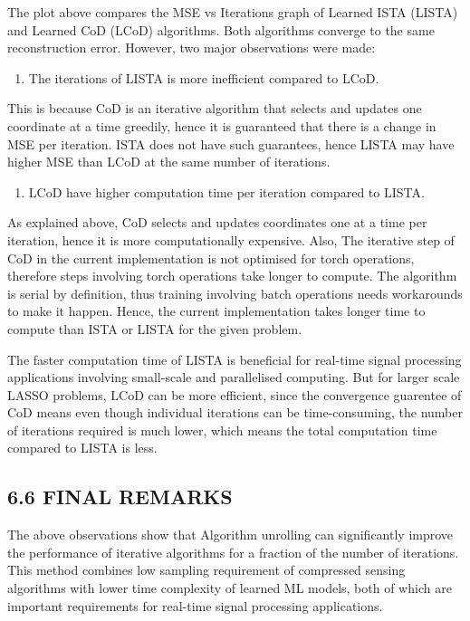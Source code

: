 \documentclass[
  letterpaper,
  DIV=11,
  numbers=noendperiod]{scrartcl}
\providecommand{\tightlist}{%
  \setlength{\itemsep}{0pt}\setlength{\parskip}{0pt}}
\begin{document}
The plot above compares the MSE vs Iterations graph of Learned ISTA
(LISTA) and Learned CoD (LCoD) algorithms. Both algorithms converge to
the same reconstruction error. However, two major observations were
made:

\begin{enumerate}
\def\labelenumi{\arabic{enumi}.}
\tightlist
\item
  The iterations of LISTA is more inefficient compared to LCoD.
\end{enumerate}

This is because CoD is an iterative algorithm that selects and updates
one coordinate at a time greedily, hence it is guaranteed that there is
a change in MSE per iteration. ISTA does not have such guarantees, hence
LISTA may have higher MSE than LCoD at the same number of iterations.

\begin{enumerate}
\def\labelenumi{\arabic{enumi}.}
\setcounter{enumi}{1}
\tightlist
\item
  LCoD have higher computation time per iteration compared to LISTA.
\end{enumerate}

As explained above, CoD selects and updates coordinates one at a time
per iteration, hence it is more computationally expensive. Also, The
iterative step of CoD in the current implementation is not optimised for
torch operations, therefore steps involving torch operations take longer
to compute. The algorithm is serial by definition, thus training
involving batch operations needs workarounds to make it happen. Hence,
the current implementation takes longer time to compute than ISTA or
LISTA for the given problem.

The faster computation time of LISTA is beneficial for real-time signal
processing applications involving small-scale and parallelised
computing. But for larger scale LASSO problems, LCoD can be more
efficient, since the convergence guarentee of CoD means even though
individual iterations can be time-consuming, the number of iterations
required is much lower, which means the total computation time compared
to LISTA is less.

\subsection{6.6 FINAL REMARKS}\label{final-remarks}

The above observations show that Algorithm unrolling can significantly
improve the performance of iterative algorithms for a fraction of the
number of iterations. This method combines low sampling requirement of
compressed sensing algorithms with lower time complexity of learned ML
models, both of which are important requirements for real-time signal
processing applications.
\end{document}
